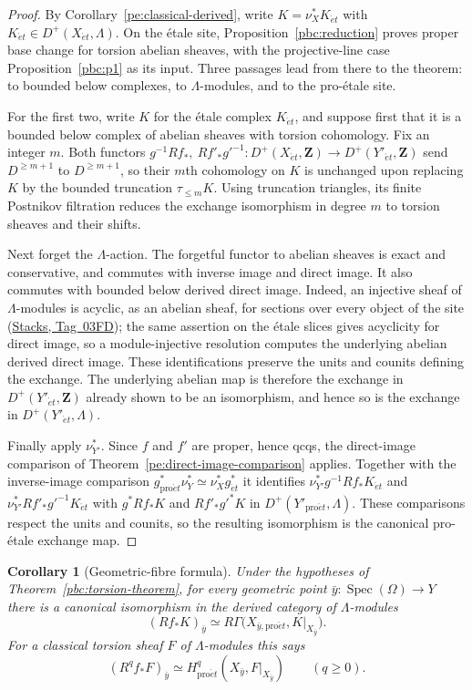 \documentclass[11pt,a4paper]{article}
\numberwithin{equation}{section}
\newtheorem{corollary}[theorem]{Corollary}
\theoremstyle{definition}
\theoremstyle{remark}
\newcommand{\et}{\acute{e}t}
\newcommand{\proet}{\mathrm{pro}\acute{e}t}
\newcommand{\stacks}[1]{\href{https://stacks.math.columbia.edu/tag/#1}{\textnormal{Stacks, Tag~#1}}}
\newcommand{\Z}{\mathbf Z}
\begin{document}
\begin{proof}
By Corollary~\ref{pe:classical-derived}, write $K=\nu_X^*K_{\et}$
with $K_{\et}\in D^+(X_{\et},\Lambda)$. On the \'etale site,
Proposition~\ref{pbc:reduction} proves proper base change for torsion
abelian sheaves, with the projective-line case
Proposition~\ref{pbc:p1} as its input. Three passages lead from there
to the theorem: to bounded below complexes, to $\Lambda$-modules, and
to the pro-\'etale site.

For the first two, write $K$ for the \'etale complex $K_{\et}$, and
suppose first that it is a bounded below complex of abelian sheaves
with torsion cohomology. Fix an integer $m$. Both functors
$g^{-1}Rf_*,\ Rf'_*g'^{-1}\colon D^+(X_{\et},\Z)\to D^+(Y'_{\et},\Z)$
send $D^{\geq m+1}$ to $D^{\geq m+1}$, so their $m$th
cohomology on $K$ is unchanged upon replacing $K$ by the bounded
truncation $\tau_{\leq m}K$. Using truncation triangles, its finite
Postnikov filtration reduces the exchange isomorphism in degree $m$ to
torsion sheaves and their shifts.

Next forget the $\Lambda$-action. The forgetful functor to abelian
sheaves is exact and conservative, and commutes with inverse image
and direct image. It also commutes with bounded below derived direct
image. Indeed, an injective sheaf of $\Lambda$-modules is acyclic, as an
abelian sheaf, for sections over every object of the site
(\stacks{03FD}); the same assertion on the \'etale slices gives
acyclicity for direct image, so a module-injective resolution
computes the underlying abelian derived direct image.
These identifications preserve the units and counits defining the
exchange. The underlying abelian map is therefore the exchange in
$D^+(Y'_{\et},\Z)$ already shown to be an isomorphism, and hence so is
the exchange in $D^+(Y'_{\et},\Lambda)$.

Finally apply $\nu_{Y'}^*$. Since $f$ and $f'$ are proper, hence qcqs,
the direct-image comparison of
Theorem~\ref{pe:direct-image-comparison} applies. Together with the
inverse-image comparison $g_{\proet}^*\nu_Y^*\simeq\nu_X^*g_{\et}^*$ it
identifies $\nu_{Y'}^*g^{-1}Rf_*K_{\et}$ and
$\nu_{Y'}^*Rf'_*g'^{-1}K_{\et}$ with $g^*Rf_*K$ and $Rf'_*g'^*K$ in
$D^+(Y'_{\proet},\Lambda)$. These comparisons respect the units and counits, so the
resulting isomorphism is the canonical pro-\'etale exchange map.
\end{proof}

\begin{corollary}[Geometric-fibre formula]\label{pbc:torsion-stalk}
Under the hypotheses of Theorem~\ref{pbc:torsion-theorem}, for every
geometric point $\bar y:\operatorname{Spec}(\Omega)\to Y$ there is a
canonical isomorphism in the derived category of $\Lambda$-modules
\[
 (Rf_*K)_{\bar y}\simeq
 R\Gamma\bigl(X_{\bar y,\proet},K|_{X_{\bar y}}\bigr).
\]
For a classical torsion sheaf $F$ of $\Lambda$-modules this says
\[
 (R^qf_*F)_{\bar y}\simeq
 H^q_{\proet}(X_{\bar y},F|_{X_{\bar y}})\qquad(q\geq0).
\]
\end{corollary}
\end{document}
